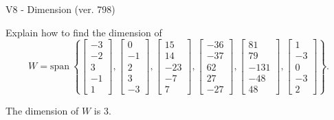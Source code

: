 \begin{exercise}
  \begin{exerciseTitle}V8 - Dimension (ver. 798)\end{exerciseTitle}
  \begin{exerciseStatement}
    Explain how to find the dimension of 
\[W=\mathrm{span}\ \left\{\left[\begin{array}{r}
-3 \\
-2 \\
3 \\
-1 \\
1
\end{array}\right] , \left[\begin{array}{r}
0 \\
-1 \\
2 \\
3 \\
-3
\end{array}\right] , \left[\begin{array}{r}
15 \\
14 \\
-23 \\
-7 \\
7
\end{array}\right] , \left[\begin{array}{r}
-36 \\
-37 \\
62 \\
27 \\
-27
\end{array}\right] , \left[\begin{array}{r}
81 \\
79 \\
-131 \\
-48 \\
48
\end{array}\right] , \left[\begin{array}{r}
1 \\
-3 \\
0 \\
-3 \\
2
\end{array}\right]\right\}.\]



  \end{exerciseStatement}
  \begin{exerciseAnswer}
   The dimension of \(W\) is  \(3\).
  


  \end{exerciseAnswer}
\end{exercise}